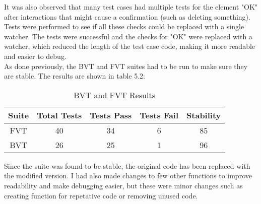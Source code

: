 It was also observed that many test cases had multiple tests for the element "OK" after interactions that might cause a confirmation (such as deleting something). Tests were performed to see if all these checks could be replaced with a single watcher. The tests were successful and the checks for "OK" were replaced with a watcher, which reduced the length of the test case code, making it more readable and easier to debug.\\

As done previously, the BVT and FVT suites had to be run to make sure they are stable. The results are shown in table 5.2:

\begin{table}[!h]
\centering
\caption{BVT and FVT Results}
\begin{tabular}{|c|c|c|c|c|}
\hline
Suite & Total Tests & Tests Pass & Tests Fail & Stability \\ \hline
FVT   & 40          & 34         & 6          & 85        \\ \hline
BVT   & 26          & 25         & 1          & 96       \\ \hline         
\end{tabular}
\end{table} 

Since the suite was found to be stable, the original code has been replaced with the modified version. I had also made changes to few other functions to improve readability and make debugging easier, but these were minor changes such as creating function for repetative code or removing unused code.